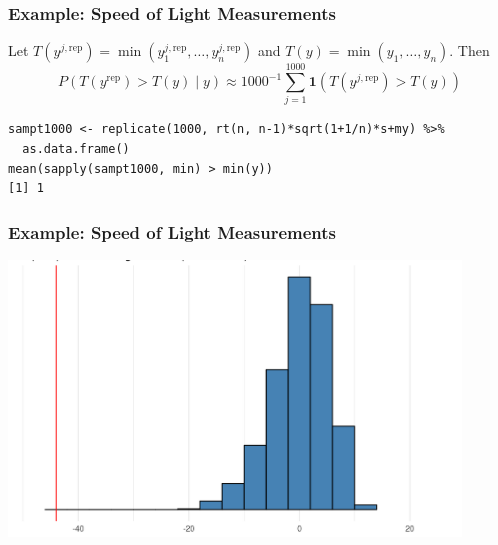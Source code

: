 \documentclass{beamer}
\begin{document}
\begin{frame}[fragile]
\frametitle{Example: Speed of Light Measurements}

Let $T(y^{j,\text{rep}}) = \min(y_1^{j,\text{rep}}, \ldots, y_n^{j,\text{rep}})$ and $T(y) = \min(y_1, \ldots, y_n)$. Then
\[
P(T(y^{\text{rep}}) > T(y) \mid y)  \approx 1000^{-1} \sum_{j=1}^{1000} \mathbf{1}\left(T(y^{j,\text{rep}}) > T(y) \right)
\]

\begin{verbatim}
sampt1000 <- replicate(1000, rt(n, n-1)*sqrt(1+1/n)*s+my) %>%
  as.data.frame()
mean(sapply(sampt1000, min) > min(y))
[1] 1
\end{verbatim}

\end{frame}


\begin{frame}
\frametitle{Example: Speed of Light Measurements}

\begin{center}
\includegraphics[width=120mm]{mins_histogram.png}
\end{center}

\end{frame}
\end{document}
